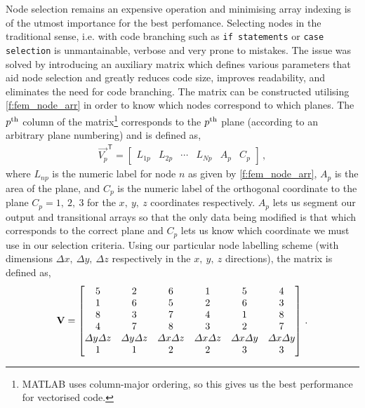 Node selection remains an expensive operation and minimising array indexing is of the utmost importance for the best perfomance. Selecting nodes in the traditional sense, i.e. with code branching such as \texttt{if statements} or \texttt{case selection} is unmantainable, verbose and very prone to mistakes. The issue was solved by introducing an auxiliary matrix which defines various parameters that aid node selection and greatly reduces code size, improves readability, and eliminates the need for code branching. The matrix can be constructed utilising \cref{f:fem_node_arr} in order to know which nodes correspond to which  planes. The $ p\textsuperscript{th} $ column of the matrix\footnote{MATLAB uses column-major ordering, so this gives us the best performance for vectorised code.} corresponds to the $ p\textsuperscript{th} $ plane (according to an arbitrary plane numbering) and is defined as,
\begin{align}\label{eq:surf_node_util_vec}
	\vec{V_{p}}^{\mathsf{T}} =
	\begin{bmatrix}
		L_{1p} & L_{2p} & \cdots & L_{Np} & A_{p} & C_{p}
	\end{bmatrix}\,,
\end{align}
where $ L_{np} $ is the numeric label for node $ n $ as given by \cref{f:fem_node_arr}, $ A_{p} $ is the area of the plane, and $ C_{p} $ is the numeric label of the orthogonal coordinate to the plane $ C_{p} = 1, ~2, ~3 $ for the $ x, ~y, ~z $ coordinates respectively. $ A_{p} $ lets us segment our output and transitional arrays so that the only data being modified is that which corresponds to the correct plane and $ C_{p} $ lets us know which coordinate we must use in our selection criteria. Using our particular node labelling scheme (with dimensions $ \Delta x,~ \Delta y,~ \Delta z $ respectively in the $ x,~ y,~ z $ directions), the matrix is defined as,
\begin{align}\label{eq:surf_node_util}
	\mathbf{V} =
	\begin{bmatrix}
		5                 & 2                 & 6                 & 1                 & 5                 & 4                 \\
		1                 & 6                 & 5                 & 2                 & 6                 & 3                 \\
		8                 & 3                 & 7                 & 4                 & 1                 & 8                 \\
		4                 & 7                 & 8                 & 3                 & 2                 & 7                 \\
		\Delta y \Delta z & \Delta y \Delta z & \Delta x \Delta z & \Delta x \Delta z & \Delta x \Delta y & \Delta x \Delta y \\
		1                 & 1                 & 2                 & 2                 & 3                 & 3
	\end{bmatrix}\,.
\end{align}
